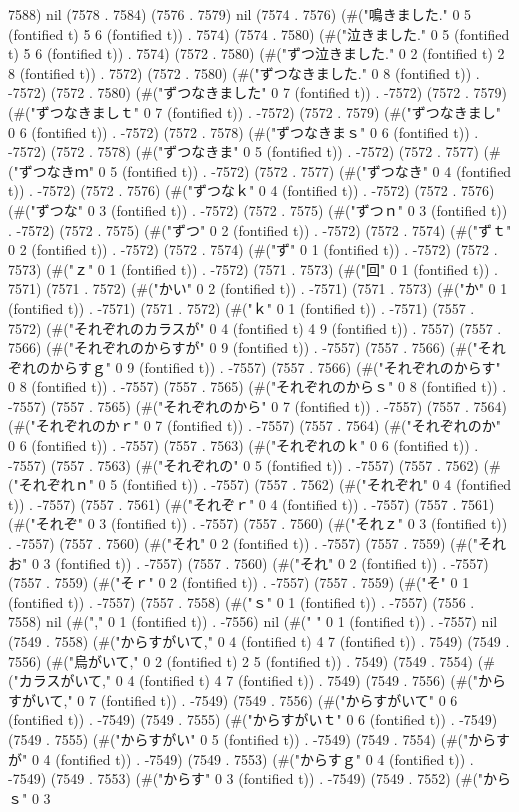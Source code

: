 7588) nil (7578 . 7584) (7576 . 7579) nil (7574 . 7576) (#("鳴きました." 0 5 (fontified t) 5 6 (fontified t)) . 7574) (7574 . 7580) (#("泣きました." 0 5 (fontified t) 5 6 (fontified t)) . 7574) (7572 . 7580) (#("ずつ泣きました." 0 2 (fontified t) 2 8 (fontified t)) . 7572) (7572 . 7580) (#("ずつなきました." 0 8 (fontified t)) . -7572) (7572 . 7580) (#("ずつなきました" 0 7 (fontified t)) . -7572) (7572 . 7579) (#("ずつなきましｔ" 0 7 (fontified t)) . -7572) (7572 . 7579) (#("ずつなきまし" 0 6 (fontified t)) . -7572) (7572 . 7578) (#("ずつなきまｓ" 0 6 (fontified t)) . -7572) (7572 . 7578) (#("ずつなきま" 0 5 (fontified t)) . -7572) (7572 . 7577) (#("ずつなきｍ" 0 5 (fontified t)) . -7572) (7572 . 7577) (#("ずつなき" 0 4 (fontified t)) . -7572) (7572 . 7576) (#("ずつなｋ" 0 4 (fontified t)) . -7572) (7572 . 7576) (#("ずつな" 0 3 (fontified t)) . -7572) (7572 . 7575) (#("ずつｎ" 0 3 (fontified t)) . -7572) (7572 . 7575) (#("ずつ" 0 2 (fontified t)) . -7572) (7572 . 7574) (#("ずｔ" 0 2 (fontified t)) . -7572) (7572 . 7574) (#("ず" 0 1 (fontified t)) . -7572) (7572 . 7573) (#("ｚ" 0 1 (fontified t)) . -7572) (7571 . 7573) (#("回" 0 1 (fontified t)) . 7571) (7571 . 7572) (#("かい" 0 2 (fontified t)) . -7571) (7571 . 7573) (#("か" 0 1 (fontified t)) . -7571) (7571 . 7572) (#("ｋ" 0 1 (fontified t)) . -7571) (7557 . 7572) (#("それぞれのカラスが" 0 4 (fontified t) 4 9 (fontified t)) . 7557) (7557 . 7566) (#("それぞれのからすが" 0 9 (fontified t)) . -7557) (7557 . 7566) (#("それぞれのからすｇ" 0 9 (fontified t)) . -7557) (7557 . 7566) (#("それぞれのからす" 0 8 (fontified t)) . -7557) (7557 . 7565) (#("それぞれのからｓ" 0 8 (fontified t)) . -7557) (7557 . 7565) (#("それぞれのから" 0 7 (fontified t)) . -7557) (7557 . 7564) (#("それぞれのかｒ" 0 7 (fontified t)) . -7557) (7557 . 7564) (#("それぞれのか" 0 6 (fontified t)) . -7557) (7557 . 7563) (#("それぞれのｋ" 0 6 (fontified t)) . -7557) (7557 . 7563) (#("それぞれの" 0 5 (fontified t)) . -7557) (7557 . 7562) (#("それぞれｎ" 0 5 (fontified t)) . -7557) (7557 . 7562) (#("それぞれ" 0 4 (fontified t)) . -7557) (7557 . 7561) (#("それぞｒ" 0 4 (fontified t)) . -7557) (7557 . 7561) (#("それぞ" 0 3 (fontified t)) . -7557) (7557 . 7560) (#("それｚ" 0 3 (fontified t)) . -7557) (7557 . 7560) (#("それ" 0 2 (fontified t)) . -7557) (7557 . 7559) (#("それお" 0 3 (fontified t)) . -7557) (7557 . 7560) (#("それ" 0 2 (fontified t)) . -7557) (7557 . 7559) (#("そｒ" 0 2 (fontified t)) . -7557) (7557 . 7559) (#("そ" 0 1 (fontified t)) . -7557) (7557 . 7558) (#("ｓ" 0 1 (fontified t)) . -7557) (7556 . 7558) nil (#("," 0 1 (fontified t)) . -7556) nil (#(" " 0 1 (fontified t)) . -7557) nil (7549 . 7558) (#("からすがいて," 0 4 (fontified t) 4 7 (fontified t)) . 7549) (7549 . 7556) (#("烏がいて," 0 2 (fontified t) 2 5 (fontified t)) . 7549) (7549 . 7554) (#("カラスがいて," 0 4 (fontified t) 4 7 (fontified t)) . 7549) (7549 . 7556) (#("からすがいて," 0 7 (fontified t)) . -7549) (7549 . 7556) (#("からすがいて" 0 6 (fontified t)) . -7549) (7549 . 7555) (#("からすがいｔ" 0 6 (fontified t)) . -7549) (7549 . 7555) (#("からすがい" 0 5 (fontified t)) . -7549) (7549 . 7554) (#("からすが" 0 4 (fontified t)) . -7549) (7549 . 7553) (#("からすｇ" 0 4 (fontified t)) . -7549) (7549 . 7553) (#("からす" 0 3 (fontified t)) . -7549) (7549 . 7552) (#("からｓ" 0 3 